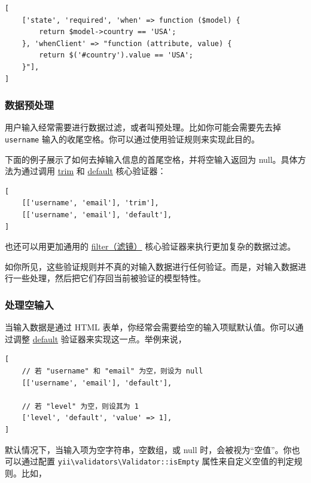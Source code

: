 \lstset{language=php}\begin{lstlisting}
[
    ['state', 'required', 'when' => function ($model) {
        return $model->country == 'USA';
    }, 'whenClient' => "function (attribute, value) {
        return $('#country').value == 'USA';
    }"],
]
\end{lstlisting}
\subsubsection{数据预处理 \label{input-validation.md::data-filtering}}
用户输入经常需要进行数据过滤，或者叫预处理。比如你可能会需要先去掉 \lstinline|username| 输入的收尾空格。你可以通过使用验证规则来实现此目的。

下面的例子展示了如何去掉输入信息的首尾空格，并将空输入返回为 null。具体方法为通过调用 \hyperref[tutorial-core-validators.md::trim]{trim} 和 \hyperref[tutorial-core-validators.md::default]{default} 核心验证器：

\lstset{language=php}\begin{lstlisting}
[
    [['username', 'email'], 'trim'],
    [['username', 'email'], 'default'],
]
\end{lstlisting}
也还可以用更加通用的 \hyperref[tutorial-core-validators.md::filter]{filter（滤镜）} 核心验证器来执行更加复杂的数据过滤。

如你所见，这些验证规则并不真的对输入数据进行任何验证。而是，对输入数据进行一些处理，然后把它们存回当前被验证的模型特性。

\subsubsection{处理空输入 \label{input-validation.md::handling-empty-inputs}}
当输入数据是通过 HTML 表单，你经常会需要给空的输入项赋默认值。你可以通过调整
\hyperref[tutorial-core-validators.md::default]{default} 验证器来实现这一点。举例来说，

\lstset{language=php}\begin{lstlisting}
[
    // 若 "username" 和 "email" 为空，则设为 null
    [['username', 'email'], 'default'],

    // 若 "level" 为空，则设其为 1
    ['level', 'default', 'value' => 1],
]
\end{lstlisting}
默认情况下，当输入项为空字符串，空数组，或 null 时，会被视为“空值”。你也可以通过配置
\texttt{yii{\allowbreak{}\textbackslash}validators{\allowbreak{}\textbackslash}Validator\allowbreak{}::\allowbreak{}isEmpty} 属性来自定义空值的判定规则。比如，

